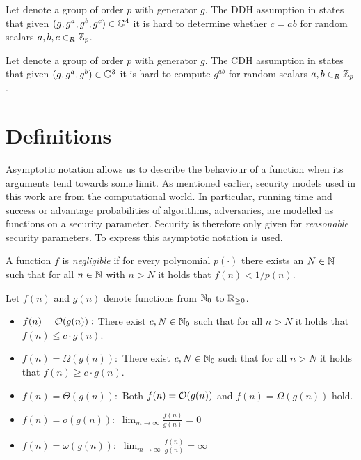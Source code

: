 \begin{definition}\label{def:ddh}
Let \GG denote a group of order $p$ with generator $g$.
The \ac{DDH} assumption in \GG states that given $(g,g^a,g^b,g^c)\in\mathbb{G}^4$ it is hard to determine whether $c=ab$ for random scalars $a,b,c\in_R\mathbb{Z}_p$.
\eod
\end{definition}

\begin{definition}\label{def:cdh}
Let \GG denote a group of order $p$ with generator $g$.
The \ac{CDH} assumption in \GG states that given $(g,g^a,g^b)\in\mathbb{G}^3$ it is hard to compute $g^{ab}$ for random scalars $a,b\in_R\mathbb{Z}_p$.
\eod
\end{definition}

\section{Definitions}
Asymptotic notation allows us to describe the behaviour of a function when its arguments tend towards some limit.
As mentioned earlier, security models used in this work are from the computational world.
In particular, running time and success or advantage probabilities of algorithms, \ie adversaries, are modelled as functions on a security parameter.
Security is therefore only given for \emph{reasonable} security parameters.
To express this asymptotic notation is used.

\begin{definition}\label{def:negligible}
A function $f$ is \emph{negligible} if for every polynomial $p(\cdot)$ there exists an $N\in\mathbb{N}$ such that for all $n\in\mathbb{N}$ with $n>N$ it holds that $f(n)<1/p(n)$.
\eod
\end{definition}

\begin{definition}\label{def:asymptotic}
Let $f(n)$ and $g(n)$ denote functions from $\mathbb{N}_0$ to $\mathbb{R}_{\geq 0}$.
\begin{itemize}
	\item $f(n)=\mathcal{O}(g(n)):$ There exist $c,N\in\mathbb{N}_0$ such that for all $n>N$ it holds that $f(n)\leq c\cdot g(n)$.
	\item $f(n)=\Omega(g(n)):$ There exist $c,N\in\mathbb{N}_0$ such that for all $n>N$ it holds that $f(n)\geq c\cdot g(n)$.
	\item $f(n)=\Theta(g(n)):$ Both $f(n)=\mathcal{O}(g(n))$ and $f(n)=\Omega(g(n))$ hold.
	\item $f(n)=o(g(n)):$ $\lim_{m\rightarrow\infty}\frac{f(n)}{g(n)}=0$
	\item $f(n)=\omega(g(n)):$ $\lim_{m\rightarrow\infty}\frac{f(n)}{g(n)}=\infty$ 
	\eod
\end{itemize}
\end{definition}


